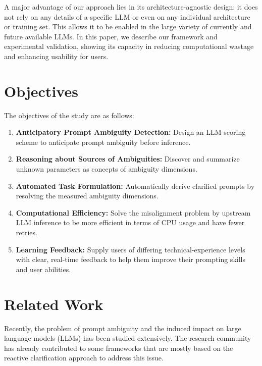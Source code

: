 \documentclass[11pt,a4paper]{article}
\begin{document}
A major advantage of our approach lies in its architecture-agnostic design: it does not rely on any details of a specific LLM or even on any individual architecture or training set. This allows it to be enabled in the large variety of currently and future available LLMs. In this paper, we describe our framework and experimental validation, showing its capacity in reducing computational wastage and enhancing usability for users.

\section{Objectives}
The objectives of the study are as follows:
\begin{enumerate}
    \item \textbf{Anticipatory Prompt Ambiguity Detection:} Design an LLM scoring scheme to anticipate prompt ambiguity before inference.
    \item \textbf{Reasoning about Sources of Ambiguities:} Discover and summarize unknown parameters as concepts of ambiguity dimensions.
    \item \textbf{Automated Task Formulation:} Automatically derive clarified prompts by resolving the measured ambiguity dimensions.
    \item \textbf{Computational Efficiency:} Solve the misalignment problem by upstream LLM inference to be more efficient in terms of CPU usage and have fewer retries.
    \item \textbf{Learning Feedback:} Supply users of differing technical-experience levels with clear, real-time feedback to help them improve their prompting skills and user abilities.
\end{enumerate}

\section{Related Work}
Recently, the problem of prompt ambiguity and the induced impact on large language models (LLMs) has been studied extensively. The research community has already contributed to some frameworks that are mostly based on the reactive clarification approach to address this issue.
\end{document}
